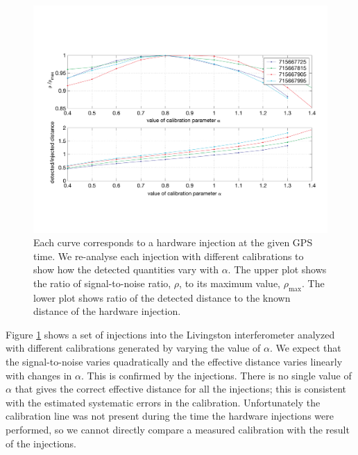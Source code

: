 \begin{figure}[htb]
  \vspace{5pt}
  \begin{flushright}
    \includegraphics[width=\textwidth]{calibration}    
  \end{flushright}
  \caption{%
  Each curve corresponds to a hardware injection at the given GPS time. We
  re-analyse each injection with different calibrations to show how the
  detected quantities vary with $\alpha$. The upper plot shows the ratio of
  signal-to-noise ratio, $\rho$, to its maximum value, $\rho_{\mathrm{max}}$.
  The lower plot shows ratio of the detected distance to the known distance of
  the hardware injection.
  }
\label{f:calibration}
\end{figure}
Figure \ref{f:calibration} shows a set of injections into the Livingston
interferometer analyzed with different calibrations generated by varying the
value of $\alpha$. We expect that the signal-to-noise varies quadratically and
the effective distance varies linearly with changes in $\alpha$\cite{bruce}.
This is confirmed by the injections.  There is no single value of $\alpha$
that gives the correct effective distance for all the injections; this is
consistent with the estimated systematic errors in the calibration.
Unfortunately the calibration line was not present during the time the
hardware injections were performed, so we cannot directly compare a measured
calibration with the result of the injections.
